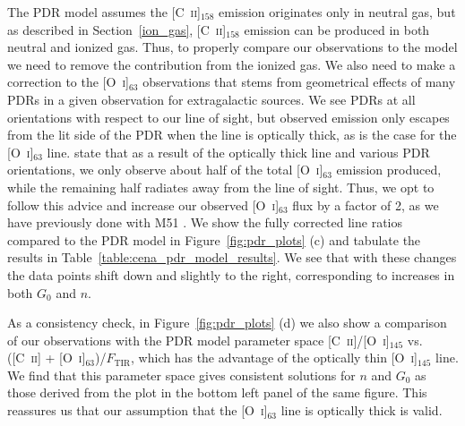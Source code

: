 The PDR model assumes the [C~\textsc{ii}]$_{158}$ emission originates only in neutral gas, but as described in Section~\ref{ion_gas}, [C~\textsc{ii}]$_{158}$ emission can be produced in both neutral and ionized gas.  Thus, to properly compare our observations to the model we need to remove the contribution from the ionized gas.  We also need to make a correction to the [O~\textsc{i}]$_{63}$ observations that stems from geometrical effects of many PDRs in a given observation for extragalactic sources.  We see PDRs at all orientations with respect to our line of sight, but observed emission only escapes from the lit side of the PDR when the line is optically thick, as is the case for the [O~\textsc{i}]$_{63}$ line.  \citet{1999ApJ...527..795K} state that as a result of the optically thick line and various PDR orientations, we only observe about half of the total [O~\textsc{i}]$_{63}$ emission produced, while the remaining half radiates away from the line of sight.  Thus, we opt to follow this advice and increase our observed [O~\textsc{i}]$_{63}$ flux by a factor of 2, as we have previously done with M51 \citep{parkin_2013}.  We show the fully corrected line ratios compared to the PDR model in Figure~\ref{fig:pdr_plots} (c) and tabulate the results in Table~\ref{table:cena_pdr_model_results}.  We see that with these changes the data points shift down and slightly to the right, corresponding to increases in both $G_{0}$ and $n$.

As a consistency check, in Figure~\ref{fig:pdr_plots} (d) we also show a comparison of our observations with the PDR model parameter space [C~\textsc{ii}]/[O~\textsc{i}]$_{145}$ vs. ([C~\textsc{ii}] + [O~\textsc{i}]$_{63}$)/$F_{\mathrm{TIR}}$, which has the advantage of the optically thin [O~\textsc{i}]$_{145}$ line.  We find that this parameter space gives consistent solutions for $n$ and $G_{0}$ as those derived from the plot in the bottom left panel of the same figure.  This reassures us that our assumption that the [O~\textsc{i}]$_{63}$ line is optically thick is valid.

